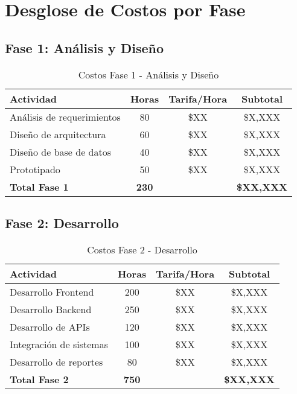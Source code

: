 \section{Desglose de Costos por Fase}

\subsection{Fase 1: Análisis y Diseño}
\begin{table}[h!]
\centering
\begin{tabular}{|l|c|c|c|}
\hline
\textbf{Actividad} & \textbf{Horas} & \textbf{Tarifa/Hora} & \textbf{Subtotal} \\
\hline
Análisis de requerimientos & 80 & \$XX & \$X,XXX \\
Diseño de arquitectura & 60 & \$XX & \$X,XXX \\
Diseño de base de datos & 40 & \$XX & \$X,XXX \\
Prototipado & 50 & \$XX & \$X,XXX \\
\hline
\textbf{Total Fase 1} & \textbf{230} & & \textbf{\$XX,XXX} \\
\hline
\end{tabular}
\caption{Costos Fase 1 - Análisis y Diseño}
\end{table}

\subsection{Fase 2: Desarrollo}
\begin{table}[h!]
\centering
\begin{tabular}{|l|c|c|c|}
\hline
\textbf{Actividad} & \textbf{Horas} & \textbf{Tarifa/Hora} & \textbf{Subtotal} \\
\hline
Desarrollo Frontend & 200 & \$XX & \$X,XXX \\
Desarrollo Backend & 250 & \$XX & \$X,XXX \\
Desarrollo de APIs & 120 & \$XX & \$X,XXX \\
Integración de sistemas & 100 & \$XX & \$X,XXX \\
Desarrollo de reportes & 80 & \$XX & \$X,XXX \\
\hline
\textbf{Total Fase 2} & \textbf{750} & & \textbf{\$XX,XXX} \\
\hline
\end{tabular}
\caption{Costos Fase 2 - Desarrollo}
\end{table}

